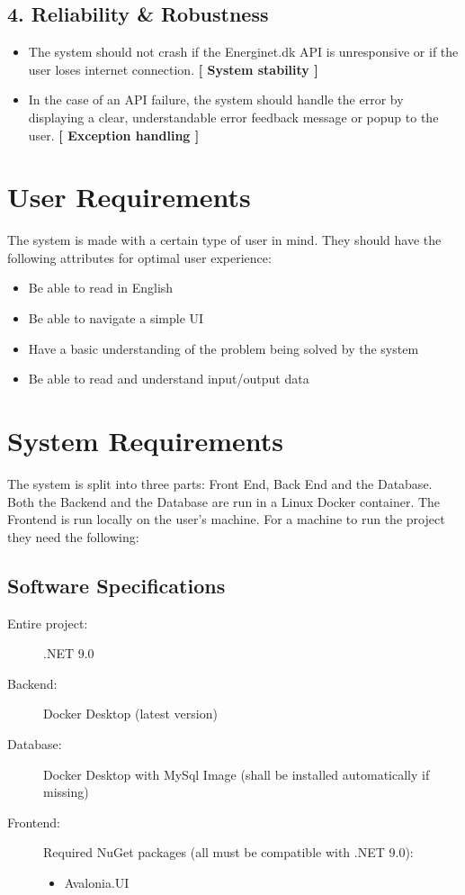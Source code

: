 \subsection*{4. Reliability \& Robustness}
\begin{itemize}
    \item The system should not crash if the Energinet.dk API is unresponsive or if the user loses internet connection. \textbf{[ System stability ]}
    \item In the case of an API failure, the system should handle the error by displaying a clear, understandable error feedback message or popup to the user. \textbf{[ Exception handling ]}
\end{itemize}


\section{User Requirements}
The system is made with a certain type of user in mind. They should have the following attributes for optimal user experience:
\begin{itemize}
    \item Be able to read in English
    \item Be able to navigate a simple UI
    \item Have a basic understanding of the problem being solved by the system
    \item Be able to read and understand input/output data
\end{itemize}


\section{System Requirements}
The system is split into three parts: Front End, Back End and the Database. Both the Backend and the Database are run in a Linux Docker container. The Frontend is run locally on the user's machine. For a machine to run the project they need the following:

\subsection*{Software Specifications}
\begin{description}
    \item[Entire project:] .NET 9.0
    \item[Backend:] Docker Desktop (latest version)
    \item[Database:] Docker Desktop with MySql Image (shall be installed automatically if missing)
    \item[Frontend:] Required NuGet packages (all must be compatible with .NET 9.0):
    \begin{itemize}
        \item Avalonia.UI
    \end{itemize}
\end{description}

